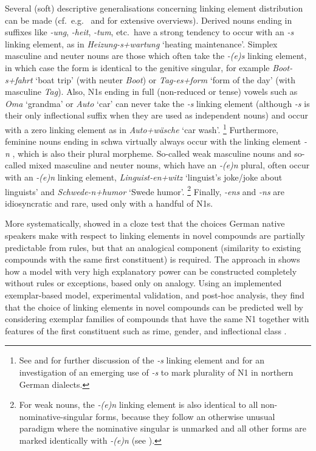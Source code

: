 Several (soft) descriptive generalisations concerning linking element distribution can be made (cf.\ e.g.\ \citealt{Fuhrhop1996} and \citealt{NueblingSzczepaniak2013} for extensive overviews).
Derived nouns ending in suffixes like \textit{-ung}, \textit{-heit}, \textit{-tum}, etc.\ have a strong tendency to occur with an \textit{-s} linking element, as in \textit{Heizung-s+wartung} `heating maintenance'.
Simplex masculine and neuter nouns are those which often take the \textit{-(e)s} linking element, in which case the form is identical to the genitive singular, for example \textit{Boot-s+fahrt} `boat trip' (with neuter \textit{Boot}) or \textit{Tag-es+form} `form of the day' (with masculine \textit{Tag}).
Also, N1s ending in full (non-reduced or tense) vowels such as \textit{Oma} `grandma' or \textit{Auto} `car' can never take the \textit{-s} linking element (although \textit{-s} is their only inflectional suffix when they are used as independent nouns) and occur with a zero linking element as in \textit{Auto+wäsche} `car wash'.%
\footnote{See \citet{Wegener2003, Wegener2005} and \citet{FuhrhopKuerschner2015} for further discussion of the \textit{-s} linking element and \citet{Fehringer2009} for an investigation of an emerging use of \textit{-s} to mark plurality of N1 in northern German dialects.}
Furthermore, feminine nouns ending in schwa virtually always occur with the linking element \textit{-n} \citep[32]{LibbenEa2002}, which is also their plural morpheme.
So-called weak masculine nouns and so-called mixed masculine and neuter nouns, which have an \textit{-(e)n} plural, often occur with an \textit{-(e)n} linking element, \eg \textit{Linguist-en+witz} `linguist's joke\slash joke about linguists' and \textit{Schwede-n+humor} `Swede humor'.%
\footnote{For weak nouns, the \textit{-(e)n} linking element is also identical to all non-nominative-singular forms, because they follow an otherwise unusual paradigm where the nominative singular is unmarked and all other forms are marked identically with \textit{-(e)n} (see \citealt{Koepcke1995,Schaefer2016c}).}
Finally, \textit{-ens} and \textit{-ns} are idiosyncratic and rare, used only with a handful of N1s.

More systematically, \citet{DresslerEa2001} showed in a cloze test that the choices German native speakers make with respect to linking elements in novel compounds are partially predictable from rules, but that an analogical component (similarity to existing compounds with the same first constituent) is required.
The approach in \citet{KrottEa2007} shows how a model with very high explanatory power can be constructed completely without rules or exceptions, based only on analogy.
Using an implemented exemplar-based model, experimental validation, and post-hoc analysis, they find that the choice of linking elements in novel compounds can be predicted well by considering exemplar families of compounds that have the same N1 together with features of the first constituent such as rime, gender, and inflectional class \citep[47]{KrottEa2007}.

